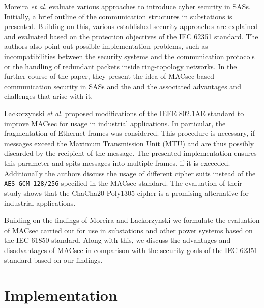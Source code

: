 \documentclass[conference]{IEEEtran}
\begin{document}
\smallskip
Moreira  \textit{et al.} \cite{Cybersecurity_Substation:2016} evaluate various approaches to introduce cyber security in SASs. Initially, a brief outline 
of the communication structures in substations is presented. Building on this, various established security approaches are explained and evaluated based 
on the protection objectives of the IEC 62351 standard. The authors also point out possible implementation problems, such as incompatibilities between 
the security systems and the communication protocols or the handling of redundant packets inside ring-topology networks. In the further course of the 
paper, they present the idea of MACsec based communication security in SASs and the and the associated advantages and challenges that arise with it. 

\smallskip
Lackorzynski \textit{et al.} \cite{MACsecIndustrialOptimization:2020} proposed modifications of the IEEE 802.1AE standard to improve MACsec for usage in 
industrial applications. In particular, the fragmentation of Ethernet frames was considered. This procedure is necessary, if messages exceed the Maximum 
Transmission Unit (MTU) and are thus possibly discarded by the recipient of the message. The presented implementation ensures this parameter and spits 
messages into multiple frames, if it is exceeded. Additionally the authors discuss the usage of different cipher suits instead of the \texttt{AES-GCM 128/256} 
specified in the MACsec standard. The evaluation of their study shows that the ChaCha20-Poly1305 cipher is a promising alternative for industrial 
applications.

\smallskip 
Building on the findings of Moreira \cite{Cybersecurity_Substation:2016} and Lackorzynski \cite{MACsecIndustrialOptimization:2020} we formulate the 
evaluation of MACsec carried out for use in substations and other power systems based on the IEC 61850 standard. Along with this, we discuss the 
advantages and disadvantages of MACsec in comparison with the security goals of the IEC 62351 standard based on our findings. 

\section{Implementation}
\label{chapter:implementation}


\end{document}
